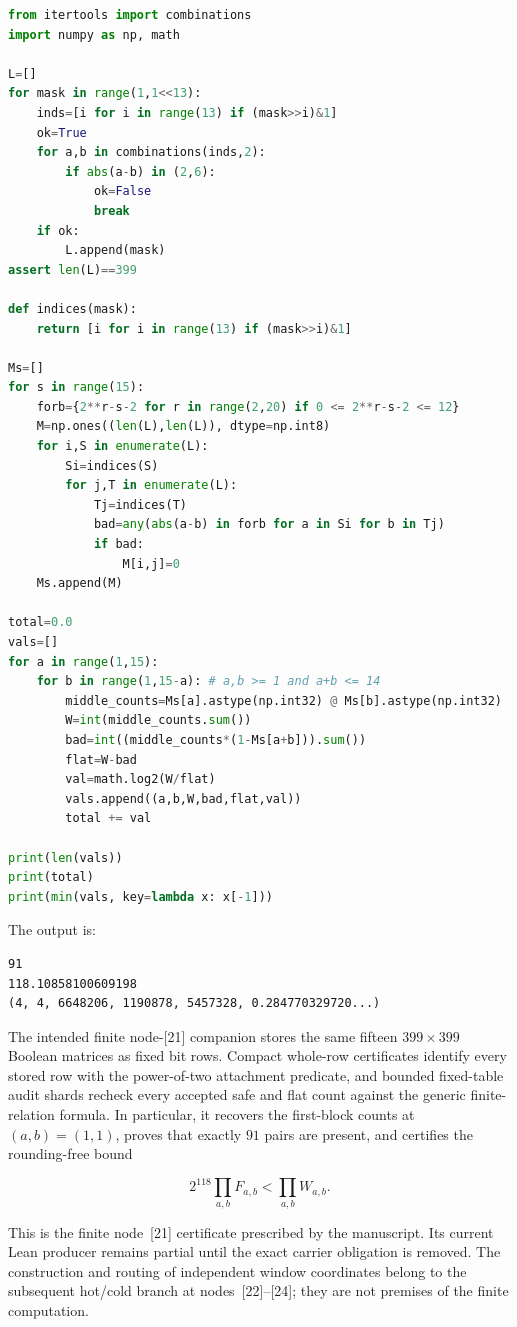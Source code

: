 \documentclass[11pt]{article}
\begin{document}
\begin{lstlisting}[language=Python]
from itertools import combinations
import numpy as np, math

L=[]
for mask in range(1,1<<13):
    inds=[i for i in range(13) if (mask>>i)&1]
    ok=True
    for a,b in combinations(inds,2):
        if abs(a-b) in (2,6):
            ok=False
            break
    if ok:
        L.append(mask)
assert len(L)==399

def indices(mask):
    return [i for i in range(13) if (mask>>i)&1]

Ms=[]
for s in range(15):
    forb={2**r-s-2 for r in range(2,20) if 0 <= 2**r-s-2 <= 12}
    M=np.ones((len(L),len(L)), dtype=np.int8)
    for i,S in enumerate(L):
        Si=indices(S)
        for j,T in enumerate(L):
            Tj=indices(T)
            bad=any(abs(a-b) in forb for a in Si for b in Tj)
            if bad:
                M[i,j]=0
    Ms.append(M)

total=0.0
vals=[]
for a in range(1,15):
    for b in range(1,15-a): # a,b >= 1 and a+b <= 14
        middle_counts=Ms[a].astype(np.int32) @ Ms[b].astype(np.int32)
        W=int(middle_counts.sum())
        bad=int((middle_counts*(1-Ms[a+b])).sum())
        flat=W-bad
        val=math.log2(W/flat)
        vals.append((a,b,W,bad,flat,val))
        total += val

print(len(vals))
print(total)
print(min(vals, key=lambda x: x[-1]))
\end{lstlisting}

The output is:
\begin{lstlisting}
91
118.10858100609198
(4, 4, 6648206, 1190878, 5457328, 0.284770329720...)
\end{lstlisting}

The intended finite node-[21] companion stores the same fifteen
\(399\times399\) Boolean
matrices as fixed bit rows.  Compact whole-row certificates identify every
stored row with the power-of-two attachment predicate, and bounded fixed-table
audit shards recheck every accepted safe and flat count against the generic
finite-relation formula.
In particular, it recovers the first-block counts at \((a,b)=(1,1)\), proves
that exactly \(91\) pairs are present, and certifies the rounding-free bound

\[
  2^{118}\prod_{a,b}F_{a,b}<\prod_{a,b}W_{a,b}.
\]

This is the finite node~[21] certificate prescribed by the manuscript.  Its
current Lean producer remains partial until the exact carrier obligation is
removed.  The construction and routing of
independent window coordinates belong to the subsequent hot/cold branch at
nodes~[22]--[24]; they are not premises of the finite computation.
\end{document}
